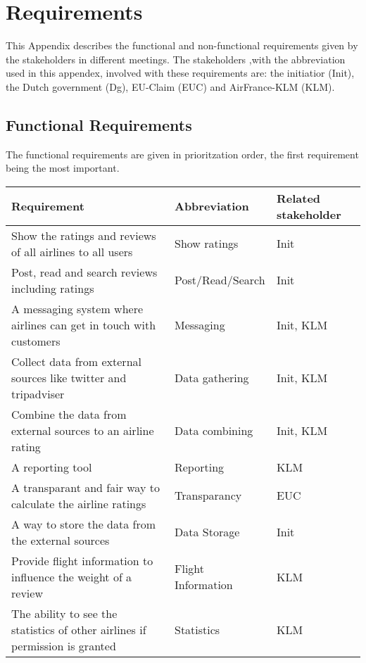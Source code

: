 \section{Requirements}
This Appendix describes the functional and non-functional requirements given by the stakeholders in different meetings. The stakeholders ,with the abbreviation used in this appendex, involved with these requirements are: the initiatior (Init), the Dutch government (Dg), EU-Claim (EUC) and AirFrance-KLM (KLM). 

\subsection*{Functional Requirements}
The functional requirements are given in prioritzation order, the first requirement being the most important. 

\begin{longtable}{| p{10cm}| l | l |}
\hline
\textbf{Requirement} & \textbf{Abbreviation} & \textbf{Related stakeholder} \\ \hline
Show the ratings and reviews of all airlines to all users & Show ratings & Init \\ \hline
Post, read and search reviews including ratings & Post/Read/Search & Init \\ \hline
A messaging system where airlines can get in touch with customers & Messaging & Init, KLM\\ \hline
Collect data from external sources like twitter and tripadviser & Data gathering &Init, KLM \\ \hline
Combine the data from external sources to an airline rating & Data combining &Init, KLM \\ \hline
A reporting tool & Reporting & KLM \\ \hline
A transparant and fair way to calculate the airline ratings & Transparancy & EUC \\ \hline
A way to store the data from the external sources & Data Storage & Init \\ \hline
Provide flight information to influence the weight of a review & Flight Information & KLM  \\ \hline
The ability to see the statistics of other airlines if permission is granted & Statistics & KLM \\ \hline 

\end{longtable}


